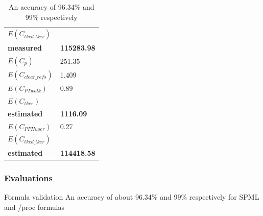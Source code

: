 \documentclass[xcolor=table,bigger,unknownkeysallowed]{beamer}
\begin{document}
\begin{frame}
\begin{table}[h]
\begin{subtable}[b]{.45\textwidth}
\begin{tabular}{l l}
			\textcolor{airforceblue}{\textbf{$E(C_{tked\_tker})$}} & \\
			\textcolor{airforceblue}{\textbf{measured}} & \multirow{-2}{*}{\textcolor{airforceblue}{\textbf{115283.98}}}\\
			\midrule
			$E(C_{p})$ & 251.35\\
			$E(C_{clear\_refs})$ & 1.409\\
			$E(C_{PT walk})$ & 0.89\\
			\textcolor{americanrose}{\textbf{$E(C_{tker})$}}  & \\
			\textcolor{americanrose}{\textbf{estimated}} & \multirow{-2}{*}{\textcolor{americanrose}{\textbf{1116.09}}}\\
			\midrule
			$E(C_{PFH user})$ & 0.27\\
			\textcolor{airforceblue}{\textbf{$E(C_{tked\_tker})$}}  &\\
			\textcolor{airforceblue}{\textbf{estimated}} &  \multirow{-2}{*}{\textcolor{airforceblue}{\textbf{114418.58}}}\\
			\bottomrule
		\end{tabular}
		\label{tab:criu-proc-formula}
	\end{subtable}
	\vspace{.3cm}
	\caption{An accuracy of 96.34\% and 99\% respectively}
	\vspace{.3cm}
\end{table}
        \end{frame}  
        \begin{frame}
                \frametitle{Evaluations}
				\begin{block}{Formula validation}
					An accuracy of about 96.34\% and 99\% respectively for SPML and /proc formulas
			\end{block}
        \end{frame}                 
\end{document}
